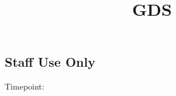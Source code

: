 \documentclass[
  14pt,
  english,
  a4paper,
  sdaps_style=code128,
  checkmode=check,
  print_questionnaire_id
]{sdapsclassic}
\title{GDS}
\author{}
\date{}
\begin{document}
\begin{questionnaire}[noinfo]


\section{Staff Use Only}

    \noindent
    \begin{minipage}[t]{0.48\linewidth}
    \end{minipage}\hfill
    \begin{minipage}[t]{0.48\linewidth}
    \end{minipage}

    \noindent
    \begin{minipage}[c]{3cm}
        Timepoint:
    \end{minipage}%
    \begin{minipage}[c]{\dimexpr\linewidth-1cm\relax}
        \begin{optionquestion}[cols=4, var=timepoint]{}
        \end{optionquestion}
    \end{minipage}


\end{questionnaire}
\end{document}
